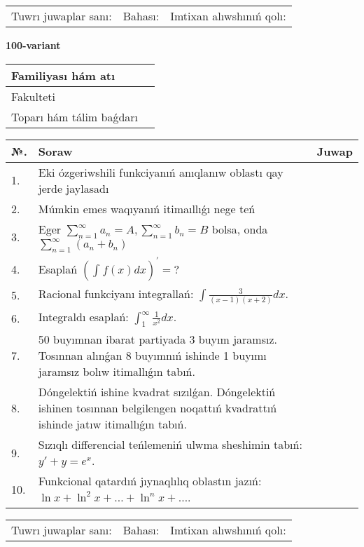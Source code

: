 \documentclass{article}
\begin{document}
\vspace{1cm}

\begin{tabular}{ c c c }
Tuwrı juwaplar sanı: \underline{\hspace{2cm}} & Bahası: \underline{\hspace{2cm}} & Imtixan alıwshınıń qolı: \underline{\hspace{2cm}} \\
\end{tabular}

\newpage

\begin{center}\textbf{100-variant}\end{center}

\bgroup
\def\arraystretch{1.5}
\begin{tabular}{ |m{6cm}|m{10cm}| }
  \hline
  Familiyası hám atı & \\
  \hline
  Fakulteti &\\
  \hline
  Toparı hám tálim baǵdarı & \\
  \hline
\end{tabular}
\egroup

\vspace{0.5cm}

\bgroup
\def\arraystretch{2}
\begin{tabular}{ |l|m{8cm}|m{7cm}| }
  \hline
  №. & Soraw & Juwap \\
  \hline
  1. & Eki ózgeriwshili funkciyanıń anıqlanıw oblastı qay jerde jaylasadı &  \\
  \hline
  2. & Múmkin emes waqıyanıń itimaıllıǵı nege teń &  \\
  \hline
  3. & Eger $\displaystyle\sum_{n = 1}^{\infty}a_{n} = A, \sum_{n = 1}^{\infty}b_{n} = B$ bolsa, onda $\displaystyle\sum_{n = 1}^{\infty}\left( a_{n} + b_{n} \right)$ &  \\
  \hline
  4. & Esaplań $\displaystyle \left( \int_{}^{}{f(x)dx} \right)^\prime = ?$ &  \\
  \hline
  5. & Racional funkciyanı integrallań: $\displaystyle\int {\frac{3}{(x - 1)(x + 2)}dx}$. &  \\
  \hline
  6. & Integraldı esaplań: $\displaystyle\int_{1}^{\infty}{\frac{1}{x^{2}}dx}$. &  \\
  \hline
  7. & 50 buyımnan ibarat partiyada 3 buyım jaramsız. Tosınnan alınǵan 8 buyımnıń ishinde 1 buyımı jaramsız bolıw itimallıǵın tabıń. &  \\
  \hline
  8. & Dóngelektiń ishine kvadrat sızılǵan. Dóngelektiń ishinen tosınnan belgilengen noqattıń kvadrattıń ishinde jatıw itimallıǵın tabıń. &  \\
  \hline
  9. & Sızıqlı differencial teńlemeniń ulwma sheshimin tabıń: $y' + y =e^{x}$. &  \\
  \hline
  10. & Funkcional qatardıń jıynaqlılıq oblastın jazıń: $\ln x + \ln^{2}x + \ldots + \ln^{n}x + \ldots$. &  \\
  \hline
\end{tabular}
\egroup

\vspace{1cm}

\begin{tabular}{ c c c }
Tuwrı juwaplar sanı: \underline{\hspace{2cm}} & Bahası: \underline{\hspace{2cm}} & Imtixan alıwshınıń qolı: \underline{\hspace{2cm}} \\
\end{tabular}

\newpage
\end{document}
